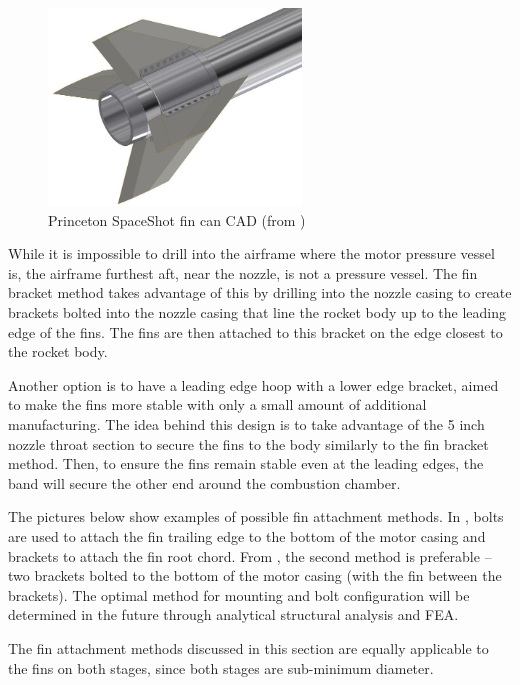 \begin{figure}
    \centering
    \includegraphics[width=0.6\textwidth]{images/princeton-fin-can}
    \caption{Princeton SpaceShot fin can CAD (from \cite{princeton})}
    \label{figure:princeton-fin-can}
\end{figure}

While it is impossible to drill into the airframe where the motor pressure vessel is, the airframe furthest aft, near the nozzle, is not a pressure vessel. The fin bracket method takes advantage of this by drilling into the nozzle casing to create brackets bolted into the nozzle casing that line the rocket body up to the leading edge of the fins. The fins are then attached to this bracket on the edge closest to the rocket body. 

Another option is to have a leading edge hoop with a lower edge bracket, aimed to make the fins more stable with only a small amount of additional manufacturing. The idea behind this design is to take advantage of the 5 inch nozzle throat section to secure the fins to the body similarly to the fin bracket method. Then, to ensure the fins remain stable even at the leading edges, the band will secure the other end around the combustion chamber.

The pictures below show examples of possible fin attachment methods. In , bolts are used to attach the fin trailing edge to the bottom of the motor casing and brackets to attach the fin root chord. From , the second method is preferable -- two brackets bolted to the bottom of the motor casing (with the fin between the brackets). The optimal method for mounting and bolt configuration will be determined in the future through analytical structural analysis and FEA.

The fin attachment methods discussed in this section are equally applicable to the fins on both stages, since both stages are sub-minimum diameter.

